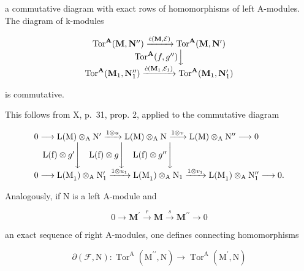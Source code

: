 a commutative diagram with exact rows of homomorphisms of left A-modules. The diagram of k-modules

\[
\begin{array}{c} \operatorname{Tor} ^ {\mathbf {A}} (\mathbf {M}, \mathbf {N} ^ {\prime \prime}) \xrightarrow {\hat {c} (\mathbf {M} , \mathcal {E})} \operatorname{Tor} ^ {\mathbf {A}} (\mathbf {M}, \mathbf {N} ^ {\prime}) \\ \operatorname{Tor} ^ {\mathbf {A}} (f, g ^ {\prime \prime}) \Big \downarrow \\ \operatorname{Tor} ^ {\mathbf {A}} (\mathbf {M} _ {1}, \mathbf {N} _ {1} ^ {\prime \prime}) \xrightarrow {\hat {c} (\mathbf {M} _ {1} , \mathcal {E} _ {1})} \operatorname{Tor} ^ {\mathbf {A}} (\mathbf {M} _ {1}, \mathbf {N} _ {1} ^ {\prime}) \end{array}
\]

is commutative.

This follows from X, p.~31, prop. 2, applied to the commutative diagram

\[
\begin{array}{l} 0 \longrightarrow \mathrm{L(M)} \otimes_ {\mathrm{A}} \mathrm{N} ^ {\prime} \xrightarrow {1 \otimes u} \mathrm{L(M)} \otimes_ {\mathrm{A}} \mathrm{N} \xrightarrow {1 \otimes v} \mathrm{L(M)} \otimes_ {\mathrm{A}} \mathrm{N} ^ {\prime \prime} \longrightarrow 0 \\ \quad \mathrm{L(f)} \otimes g ^ {\prime} \Biggl \downarrow \quad \mathrm{L(f)} \otimes g \Biggl \downarrow \quad \mathrm{L(f)} \otimes g ^ {\prime \prime} \Biggl \downarrow \\ 0 \longrightarrow \mathrm{L(M} _ {1}) \otimes_ {\mathrm{A}} \mathrm{N} _ {1} ^ {\prime} \xrightarrow {1 \otimes u _ {1}} \mathrm{L(M} _ {1}) \otimes_ {\mathrm{A}} \mathrm{N} _ {1} \xrightarrow {1 \otimes v _ {1}} \mathrm{L(M} _ {1}) \otimes_ {\mathrm{A}} \mathrm{N} _ {1} ^ {\prime \prime} \longrightarrow 0. \end{array}
\]

Analogously, if N is a left A-module and

\[
0 \to \mathbf {M} ^ {\prime} \xrightarrow {r} \mathbf {M} \xrightarrow {s} \mathbf {M} ^ {\prime \prime} \to 0\tag{F}
\]

an exact sequence of right A-modules, one defines connecting homomorphisms

\[
\partial (\mathcal {F}, \mathrm{N}): \operatorname{Tor} ^ {\mathrm{A}} \left(\mathrm{M} ^ {\prime \prime}, \mathrm{N}\right)\rightarrow \operatorname{Tor} ^ {\mathrm{A}} \left(\mathrm{M} ^ {\prime}, \mathrm{N}\right)
\]

